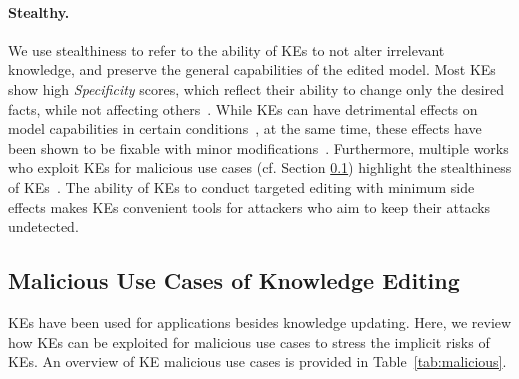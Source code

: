 \paragraph{Stealthy.} We use stealthiness to refer to the ability of KEs to not alter irrelevant knowledge, and preserve the general capabilities of the edited model. Most KEs show high \emph{Specificity} scores, which reflect their ability to change only the desired facts, while not affecting others~\cite{meng-etal-2022-memit, tan23malmen}.
While KEs can have detrimental effects on model capabilities in certain conditions~\cite{gupta-etal-2024-model, yang-etal-2024-fall}, at the same time, these effects have been shown to be fixable with minor modifications~\cite{gupta-etal-2024-rebuilding, yang-etal-2024-fall}. 
Furthermore, multiple works who exploit KEs for malicious use cases (cf. Section \ref{subsec:malicious}) highlight the stealthiness of KEs~\cite{ju-etal-2024-flooding, chen-etal-2024-can, li2024badedit, qiu2024megen}. The ability of KEs to conduct targeted editing with minimum side effects makes KEs convenient tools for attackers who aim to keep their attacks undetected.



\subsection{Malicious Use Cases of Knowledge Editing}
\label{subsec:malicious}
KEs have been used for applications besides knowledge updating. Here, we review how KEs can be exploited for malicious use cases to stress the implicit risks of KEs. An overview of KE malicious use cases is provided in Table~\ref{tab:malicious}.

